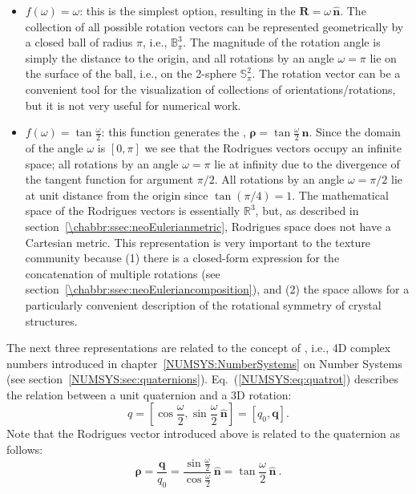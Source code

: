 \begin{itemize}
	\item \textcolor{OCSkiboRed}{$f(\omega) = \omega$}: this is the simplest option, resulting in the  $\mathbf{R}=\omega\,\hat{\mathbf{n}}$. The collection of all possible rotation vectors can be represented geometrically by a closed ball of radius $\pi$, i.e., $\mathbb{B}^3_{\pi}$. The magnitude of the rotation angle is simply the distance to the origin, and all rotations by an angle $\omega=\pi$ lie on the surface of the ball, i.e., on the 2-sphere $\mathbb{S}^2_{\pi}$.  The rotation vector can be a convenient tool for the visualization of collections of orientations/rotations, but it is not very useful for numerical work.
	
	\item \textcolor{OCSkiboRed}{$f(\omega) = \tan\frac{\omega}{2}$}: this function generates the , $\bm{\rho}= \tan\frac{\omega}{2}\,\hat{\mathbf{n}}$.  Since the domain of the angle $\omega$ is $[0,\pi]$ we see that the Rodrigues vectors occupy an infinite space; all rotations by an angle $\omega=\pi$ lie at infinity due to the divergence of the tangent function for argument $\pi/2$.  All rotations by an angle $\omega=\pi/2$ lie at unit distance from the origin since $\tan(\pi/4)=1$.  The mathematical space of the Rodrigues vectors is essentially $\mathbb{R}^3$, but, as described in section~\ref{\chabbr:ssec:neoEulerianmetric}, Rodrigues space does not have a Cartesian metric.  This representation is very important to the texture community because (1) there is a closed-form expression for the concatenation of multiple rotations (see section~\ref{\chabbr:ssec:neoEuleriancomposition}), and (2) the space allows for a particularly convenient description of the rotational symmetry of crystal structures.
\end{itemize}

\noindent The next three representations are related to the concept of , i.e., 4D complex numbers introduced in chapter~\ref{NUMSYS:NumberSystems} on Number Systems (see section~\ref{NUMSYS:sec:quaternions}). Eq.~(\ref{NUMSYS:eq:quatrot}) describes the relation between a unit quaternion and a 3D rotation:
\begin{equation}
	q = \left[\cos\frac{\omega}{2},\sin\frac{\omega}{2}\,\hat{\mathbf{n}}\right] = [q_0,\mathbf{q}].
\end{equation}
Note that the Rodrigues vector introduced above is related to the quaternion as follows:
\begin{equation}
	\bm{\rho} = \frac{\mathbf{q}}{q_0} = \frac{\sin\frac{\omega}{2}}{\cos\frac{\omega}{2}}\,\hat{\mathbf{n}} = \tan\frac{\omega}{2}\,\hat{\mathbf{n}}\ .
\end{equation}

